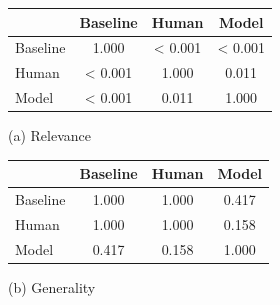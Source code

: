 \begin{figure}[h]
    \centering
    \begin{minipage}{.5\textwidth}
        \centering
        \begin{tabular}{lccc}
            \hline
                     & \textbf{Baseline} & \textbf{Human} & \textbf{Model} \\
            \hline
            Baseline & 1.000             & < 0.001        & < 0.001        \\
            Human    & < 0.001           & 1.000          & 0.011          \\
            Model    & < 0.001           & 0.011          & 1.000          \\
            \hline
        \end{tabular}
        \caption*{(a) Relevance}
    \end{minipage}%
    \begin{minipage}{.5\textwidth}
        \centering
        \begin{tabular}{lccc}
            \hline
                     & \textbf{Baseline} & \textbf{Human} & \textbf{Model} \\
            \hline
            Baseline & 1.000             & 1.000          & 0.417          \\
            Human    & 1.000             & 1.000          & 0.158          \\
            Model    & 0.417             & 0.158          & 1.000          \\
            \hline
        \end{tabular}
        \caption*{(b) Generality}
    \end{minipage}

    \vspace{1em}


\end{figure}
